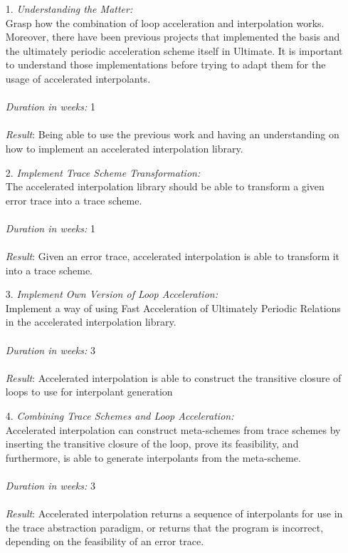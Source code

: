 \documentclass{article}
\begin{document}
\begin{itemize}
	\item[1.] \textsl{Understanding the Matter:} \\
	Grasp how the combination of loop acceleration and interpolation works. \\
	Moreover, there have been previous projects that implemented the basis \cite{ClausThesis} and the ultimately periodic acceleration scheme itself \cite{JillThesis} in Ultimate. It is important to understand those implementations before trying to adapt them for the usage of accelerated interpolants. \\ \\
	\textsl{Duration in weeks:} 1 \\\\
	\textsl{Result}: Being able to use the previous work and having an understanding on how to implement an accelerated interpolation library.
	\item[2.] \textsl{Implement Trace Scheme Transformation:} \\
	The accelerated interpolation library should be able to transform a given error trace into a trace scheme. \\\\
	\textsl{Duration in weeks:} 1 \\\\
	\textsl{Result}: Given an error trace, accelerated interpolation is able to transform it into a trace scheme.
	
	\item[3.] \textsl{Implement Own Version of Loop Acceleration:} \\
	Implement a way of using Fast Acceleration of Ultimately Periodic Relations in the accelerated interpolation library. \\ \\
	\textsl{Duration in weeks:} 3 \\ \\
	\textsl{Result}: Accelerated interpolation is able to construct the transitive closure of loops to use for interpolant generation
	
	\item[4.] \textsl{Combining Trace Schemes and Loop Acceleration:} \\
	Accelerated interpolation can construct meta-schemes from trace schemes by inserting the transitive closure of the loop, prove its feasibility, and furthermore, is able to generate interpolants from the meta-scheme. \\ \\
	\textsl{Duration in weeks:} 3 \\\\
	\textsl{Result}: Accelerated interpolation returns a sequence of interpolants for use in the trace abstraction paradigm, or returns that the program is incorrect, depending on the feasibility of an error trace.
	

\end{itemize}
\end{document}
